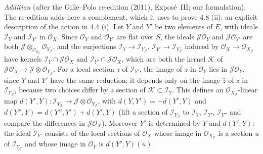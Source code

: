 \emph{Addition} (after the Gille--Polo re-edition (2011), Exposé~III; our
formulation). The re-edition adds here a complement, which it uses to prove
4.8 (ii): an explicit description of the action in 4.4 (i). Let \(Y\) and
\(Y'\) be two elements of \(E\), with ideals \(\mathscr I_Y\) and
\(\mathscr I_{Y'}\) in \(\mathscr O_X\). Since \(\mathscr O_Y\) and
\(\mathscr O_{Y'}\) are flat over \(S\), the ideals
\(\mathscr J\mathscr O_Y\) and \(\mathscr J\mathscr O_{Y'}\) are both
\(\mathscr J\otimes_{\mathscr O_{S_{\mathscr J}}}\mathscr O_{Y_{\mathscr J}}\),
and the surjections \(\mathscr I_Y\to\mathscr I_{Y_{\mathscr J}}\),
\(\mathscr I_{Y'}\to\mathscr I_{Y_{\mathscr J}}\) induced by
\(\mathscr O_X\to\mathscr O_{X_{\mathscr J}}\) have kernels
\(\mathscr I_Y\cap\mathscr J\mathscr O_X\) and
\(\mathscr I_{Y'}\cap\mathscr J\mathscr O_X\), which are both the kernel
\(\mathscr K\) of \(\mathscr J\mathscr O_X\to\mathscr J\otimes
\mathscr O_{Y_{\mathscr J}}\). For a local section \(z\) of
\(\mathscr I_{Y'}\), the image of \(z\) in \(\mathscr O_Y\) lies in
\(\mathscr J\mathscr O_Y\), since \(Y\) and \(Y'\) have the same reduction;
it depends only on the image \(\bar z\) of \(z\) in
\(\mathscr I_{Y_{\mathscr J}}\), because two choices differ by a section of
\(\mathscr K\subset\mathscr I_Y\). This defines an
\(\mathscr O_{X_{\mathscr J}}\)-linear map
\(d(Y',Y)\colon\mathscr I_{Y_{\mathscr J}}\to\mathscr J\otimes
\mathscr O_{Y_{\mathscr J}}\), with \(d(Y,Y')=-d(Y',Y)\) and
\(d(Y'',Y)=d(Y'',Y')+d(Y',Y)\) (lift a section of
\(\mathscr I_{Y_{\mathscr J}}\) to \(\mathscr I_Y\), \(\mathscr I_{Y'}\),
\(\mathscr I_{Y''}\) and compare the differences in
\(\mathscr J\mathscr O_X\)). Moreover \(Y'\) is determined by \(Y\) and
\(d(Y',Y)\): the ideal \(\mathscr I_{Y'}\) consists of the local sections of
\(\mathscr O_X\) whose image in \(\mathscr O_{X_{\mathscr J}}\) is a section
\(u\) of \(\mathscr I_{Y_{\mathscr J}}\) and whose image in \(\mathscr O_Y\) is
\(d(Y',Y)(u)\).

